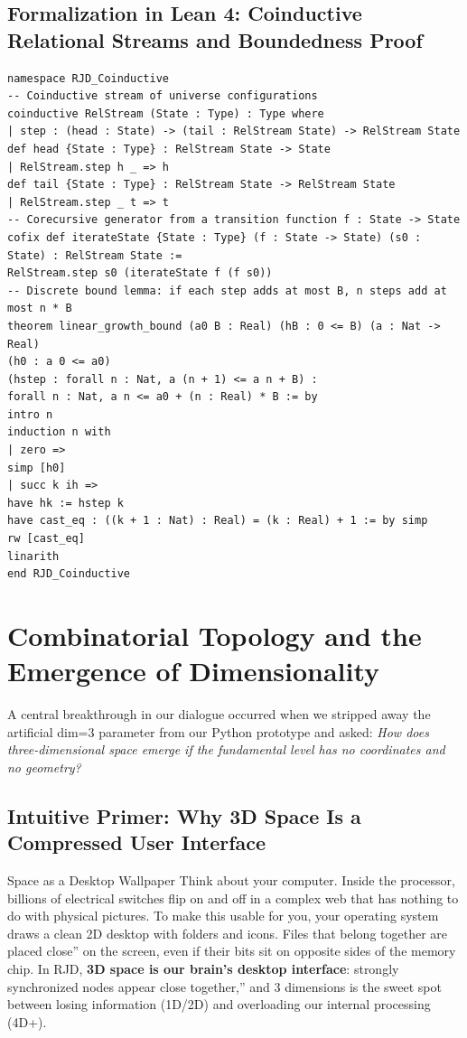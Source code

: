 \documentclass[11pt,a4paper]{article}
\theoremstyle{plain}
\theoremstyle{definition}
\theoremstyle{remark}
\begin{document}
\subsection{Formalization in Lean 4: Coinductive Relational Streams and Boundedness Proof}
\begin{lstlisting}[caption={Lean 4 formalization of the coinductive relational stream and norm bound.}]
namespace RJD_Coinductive
-- Coinductive stream of universe configurations
coinductive RelStream (State : Type) : Type where
| step : (head : State) -> (tail : RelStream State) -> RelStream State
def head {State : Type} : RelStream State -> State
| RelStream.step h _ => h
def tail {State : Type} : RelStream State -> RelStream State
| RelStream.step _ t => t
-- Corecursive generator from a transition function f : State -> State
cofix def iterateState {State : Type} (f : State -> State) (s0 : State) : RelStream State :=
RelStream.step s0 (iterateState f (f s0))
-- Discrete bound lemma: if each step adds at most B, n steps add at most n * B
theorem linear_growth_bound (a0 B : Real) (hB : 0 <= B) (a : Nat -> Real)
(h0 : a 0 <= a0)
(hstep : forall n : Nat, a (n + 1) <= a n + B) :
forall n : Nat, a n <= a0 + (n : Real) * B := by
intro n
induction n with
| zero =>
simp [h0]
| succ k ih =>
have hk := hstep k
have cast_eq : ((k + 1 : Nat) : Real) = (k : Real) + 1 := by simp
rw [cast_eq]
linarith
end RJD_Coinductive
\end{lstlisting}
\section{Combinatorial Topology and the Emergence of Dimensionality}
\label{sec:particle_zoo}
A central breakthrough in our dialogue occurred when we stripped away the artificial dim=3 parameter from our Python prototype and asked: \textit{How does three-dimensional space emerge if the fundamental level has no coordinates and no geometry?}
\subsection{Intuitive Primer: Why 3D Space Is a Compressed User Interface}
\begin{noobbox}{Space as a Desktop Wallpaper}
Think about your computer. Inside the processor, billions of electrical switches flip on and off in a complex web that has nothing to do with physical pictures. To make this usable for you, your operating system draws a clean 2D desktop with folders and icons. Files that belong together are placed close'' on the screen, even if their bits sit on opposite sides of the memory chip. In RJD, \textbf{3D space is our brain's desktop interface}: strongly synchronized nodes appear close together,'' and 3 dimensions is the sweet spot between losing information (1D/2D) and overloading our internal processing (4D+).
\end{noobbox}
\end{document}
